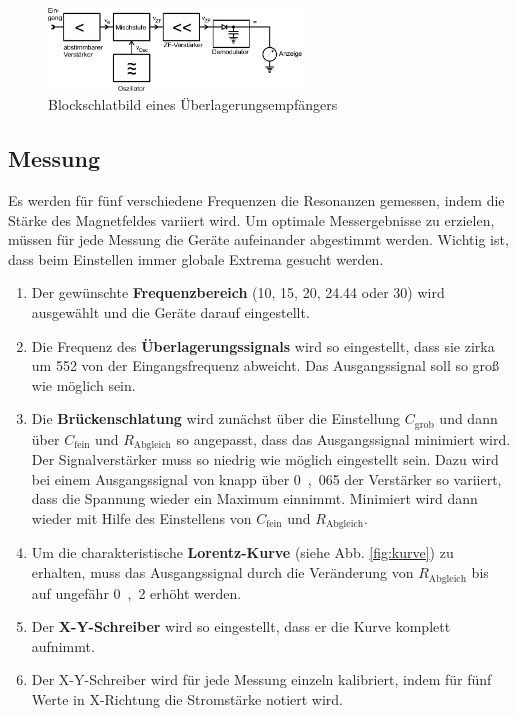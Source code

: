 \begin{figure}[h!]
	\centering
	\includegraphics[width=0.6\textwidth]{Anleitung_Abb9.pdf}
	\caption[Überlagerungsempfänger]{Blockschlatbild eines Überlagerungsempfängers \cite{V28}}
	\label{fig:verstaerker}
\end{figure}




\clearpage

\subsection{Messung}
Es werden für fünf verschiedene Frequenzen die Resonanzen gemessen, indem die Stärke des Magnetfeldes variiert wird. Um optimale Messergebnisse zu erzielen, müssen für jede Messung die Geräte aufeinander abgestimmt werden. Wichtig ist, dass beim Einstellen immer globale Extrema gesucht werden.

\begin{enumerate}
	
\item{Der gewünschte \textbf{Frequenzbereich} (10, 15, 20, 24.44 oder \si{30}{\mega\hertz}) wird ausgewählt und die Geräte darauf eingestellt.}

\item{Die Frequenz des \textbf{Überlagerungssignals} wird so eingestellt, dass sie zirka um \si{552}{\kilo\hertz} von der Eingangsfrequenz abweicht. Das Ausgangssignal soll so groß wie möglich sein.}

\item{Die \textbf{Brückenschlatung} wird zunächst über die Einstellung $C_\textrm{grob}$ und dann über $C_\textrm{fein}$ und $R_\textrm{Abgleich}$ so angepasst, dass das Ausgangssignal minimiert wird. Der Signalverstärker muss so niedrig wie möglich eingestellt sein. Dazu wird bei einem  Ausgangssignal von knapp über \si{0,065}{\volt} der Verstärker so variiert, dass die Spannung wieder ein Maximum einnimmt. Minimiert wird dann wieder mit Hilfe des Einstellens von $C_\textrm{fein}$ und $R_{\textrm{Abgleich}}$.}

\item{Um die charakteristische \textbf{Lorentz-Kurve} (siehe Abb. \ref{fig:kurve}) zu erhalten, muss das Ausgangssignal durch die Veränderung von $R_\textrm{Abgleich}$ bis auf ungefähr  \si{0,2}{\volt} erhöht werden.}

\item{Der \textbf{X-Y-Schreiber} wird so eingestellt, dass er die Kurve komplett aufnimmt.}
\item{Der X-Y-Schreiber wird für jede Messung einzeln kalibriert, indem für fünf Werte in X-Richtung die Stromstärke notiert wird.}

\end{enumerate}


